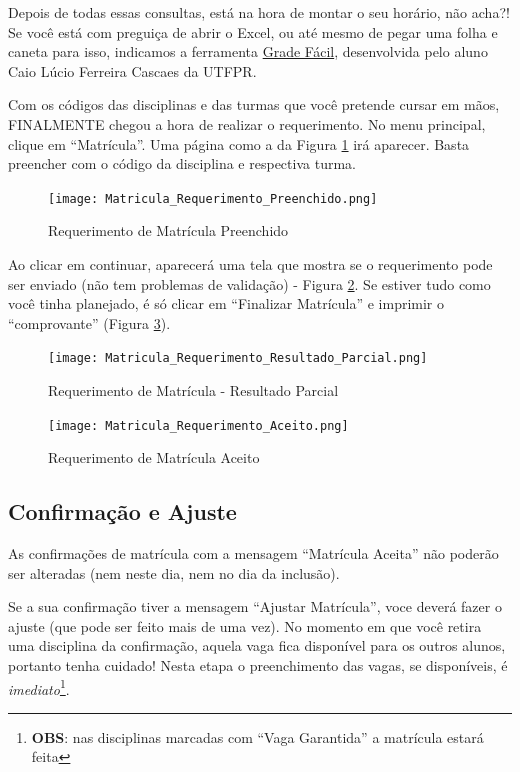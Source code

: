 \documentclass[a4paper,12pt,openany]{article}
\begin{document}
Depois de todas essas consultas, está na hora de montar o seu horário, não acha?! Se você está com preguiça de abrir o Excel, ou até mesmo de pegar uma folha e caneta para isso, indicamos a ferramenta \href{http://www.caiux.net/utfpr/}{Grade Fácil}, desenvolvida pelo aluno Caio Lúcio Ferreira Cascaes  da UTFPR.

Com os códigos das disciplinas e das turmas que você pretende cursar em mãos, FINALMENTE chegou a hora de realizar o requerimento. No menu principal, clique em ``Matrícula''. Uma página como a da Figura \ref{matriculaRequerimentoPreenchido} irá aparecer. Basta preencher com o código da disciplina e respectiva turma.

	\begin{figure}[ht!]  \centering
		\texttt{[image: Matricula\_Requerimento\_Preenchido.png]}
		\caption{Requerimento de Matrícula Preenchido}
		\label{matriculaRequerimentoPreenchido}
	\end{figure}

Ao clicar em continuar, aparecerá uma tela que mostra se o requerimento pode ser enviado (não tem problemas de validação) - Figura \ref{matriculaRequerimentoResultadoParcial}. Se estiver tudo como você tinha planejado, é só clicar em ``Finalizar Matrícula'' e imprimir o ``comprovante'' (Figura \ref{matriculaRequerimentoAceito}).

	\begin{figure}[ht!]  \centering
		\texttt{[image: Matricula\_Requerimento\_Resultado\_Parcial.png]}
		\caption{Requerimento de Matrícula - Resultado Parcial}
		\label{matriculaRequerimentoResultadoParcial}
	\end{figure}

	\begin{figure}[ht!]  \centering
		\texttt{[image: Matricula\_Requerimento\_Aceito.png]}
		\caption{Requerimento de Matrícula Aceito}
		\label{matriculaRequerimentoAceito}
	\end{figure}

\newpage

\subsection{Confirmação e Ajuste}
As confirmações de matrícula com a mensagem ``Matrícula Aceita'' não poderão ser alteradas (nem neste dia, nem no dia da inclusão).

Se a sua confirmação tiver a mensagem ``Ajustar Matrícula'', voce deverá fazer o ajuste (que pode ser feito mais de uma vez). No momento em que você retira uma disciplina da confirmação, aquela vaga fica disponível para os outros alunos, portanto tenha cuidado! Nesta etapa o preenchimento das vagas, se disponíveis, é \textit{imediato}\footnote{ \textbf{OBS}: nas disciplinas  marcadas com ``Vaga Garantida''  a matrícula estará feita}.
\end{document}
